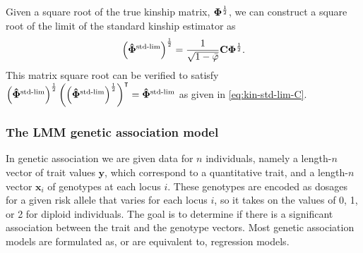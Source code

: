 \documentclass[11pt]{article}
\newcommand{\kinMat}{%
  \ensuremath{%
    \mathbf{\Phi}
  }%
  \xspace%
}%
\newcommand{\kinMatEstNamed}[1]{%
  \ensuremath{%
    \mathbf{\hat{\Phi}}^\text{#1}
  }%
  \xspace%
}%
\newcommand{\kinMatStdLim}{%
  \kinMatEstNamed{std-lim}
}%
\begin{document}
Given a square root of the true kinship matrix, $\kinMat^\frac{1}{2}$, we can construct a square root of the limit of the standard kinship estimator as
\begin{equation}
  \label{eq:eq:kin-std-lim-C-sqrt}
  \left( \kinMatStdLim \right)^\frac{1}{2}
  =
  \frac{1}{ \sqrt{ 1 - \bar{\varphi} } }
  \mathbf{C} \kinMat^\frac{1}{2}
  .
\end{equation}
This matrix square root can be verified to satisfy
$\left( \kinMatStdLim \right)^\frac{1}{2} \left( \left( \kinMatStdLim \right)^\frac{1}{2} \right)^\intercal = \kinMatStdLim$
as given in \cref{eq:kin-std-lim-C}.

\subsubsection{The LMM genetic association model}

In genetic association we are given data for $n$ individuals, namely a length-$n$ vector of trait values $\mathbf{y}$, which correspond to a quantitative trait, and a length-$n$ vector $\mathbf{x}_i$ of genotypes at each locus $i$.
These genotypes are encoded as dosages for a given risk allele that varies for each locus $i$, so it takes on the values of 0, 1, or 2 for diploid individuals.
The goal is to determine if there is a significant association between the trait and the genotype vectors.
Most genetic association models are formulated as, or are equivalent to, regression models.
\end{document}
